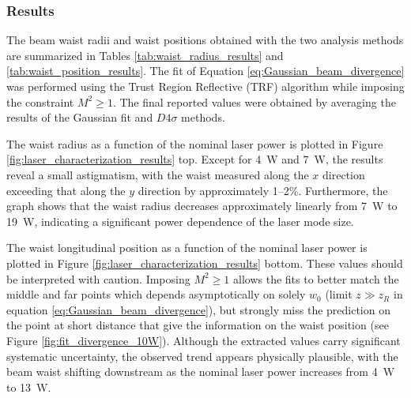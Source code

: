 \subsubsection{Results}\label{subsec:laser_char_results}

The beam waist radii and waist positions obtained with the two analysis methods are summarized in Tables \ref{tab:waist_radius_results} and \ref{tab:waist_position_results}. The fit of Equation \eqref{eq:Gaussian_beam_divergence} was performed using the Trust Region Reflective (TRF) algorithm while imposing the constraint $M^2\ge1$. The final reported values were obtained by averaging the results of the Gaussian fit and $D4\sigma$ methods.

The waist radius as a function of the nominal laser power is plotted in Figure \ref{fig:laser_characterization_results} top. Except for 4~W and 7~W, the results reveal a small astigmatism, with the waist measured along the $x$ direction exceeding that along the $y$ direction by approximately 1--2\%. Furthermore, the graph shows that the waist radius decreases approximately linearly from 7~W to 19~W, indicating a significant power dependence of the laser mode size.

The waist longitudinal position as a function of the nominal laser power is plotted in Figure \ref{fig:laser_characterization_results} bottom. These values should be interpreted with caution. Imposing $M^2\ge1$ allows the fits to better match the middle and far points which depends asymptotically on solely $w_0$ (limit $z\gg z_R$ in equation \ref{eq:Gaussian_beam_divergence}), but strongly miss the prediction on the point at short distance that give the information on the waist position (see Figure \ref{fig:fit_divergence_10W}). Although the extracted values carry significant systematic uncertainty, the observed trend appears physically plausible, with the beam waist shifting downstream as the nominal laser power increases from 4~W to 13~W.

